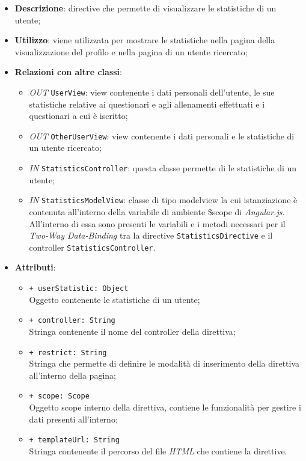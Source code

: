 \begin{itemize}
	\item \textbf{Descrizione}: directive che permette di visualizzare le statistiche di un utente;
	\item \textbf{Utilizzo}: viene utilizzata per mostrare le statistiche nella pagina della visualizzazione del profilo e nella pagina di un utente ricercato;
	\item \textbf{Relazioni con altre classi}:
	\begin{itemize}
		\item \textit{OUT} \texttt{UserView}: view contenente i dati personali dell'utente, le sue statistiche relative ai questionari e agli allenamenti effettuati e i questionari a cui è iscritto;
		\item \textit{OUT} \texttt{OtherUserView}: view contenente i dati personali e le statistiche di un utente ricercato;
		\item \textit{IN} \texttt{StatisticsController}: questa classe permette di le statistiche di un utente;
		\item \textit{IN} \texttt{StatisticsModelView}: classe di tipo modelview la cui istanziazione è contenuta all'interno della variabile di ambiente \$scope di \textit{Angular.js}. All'interno di essa sono presenti le variabili e i metodi necessari per il \textit{Two-Way Data-Binding} tra la directive \texttt{StatisticsDirective} e il controller \texttt{StatisticsController}.
	\end{itemize}
	\item \textbf{Attributi}:
	\begin{itemize}
		\item \texttt{+ userStatistic: Object} \\ Oggetto contenente le statistiche di un utente;
		\item \texttt{+ controller: String} \\ Stringa contenente il nome del controller della direttiva;
		\item \texttt{+ restrict: String} \\ Stringa che permette di definire le modalità di inserimento della direttiva all'interno della pagina;
		\item \texttt{+ scope: Scope} \\ Oggetto scope interno della direttiva, contiene le funzionalità per gestire i dati presenti all'interno;
		\item \texttt{+ templateUrl: String} \\ Stringa contenente il percorso del file \textit{HTML} che contiene la direttive.
	\end{itemize}
\end{itemize}